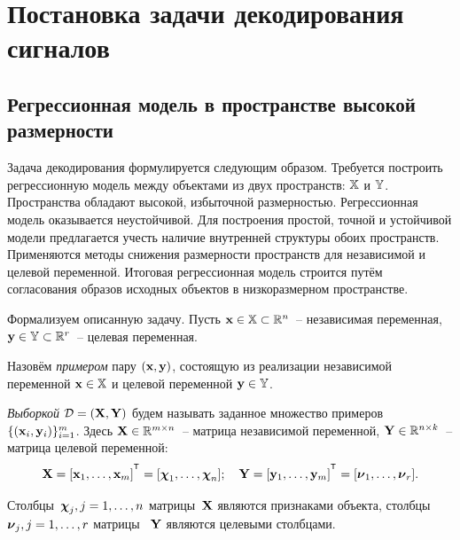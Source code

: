 \chapter{Постановка задачи декодирования сигналов}


\section{Регрессионная модель в пространстве высокой размерности}

Задача декодирования формулируется следующим образом. 
Требуется построить регрессионную модель между объектами из двух пространств: $\mathbb{X}$ и $\mathbb{Y}$.
Пространства обладают высокой, избыточной размерностью. 
Регрессионная модель оказывается неустойчивой.
Для построения простой, точной и устойчивой модели предлагается учесть наличие внутренней структуры обоих пространств. 
Применяются методы снижения размерности пространств для независимой и целевой переменной. 
Итоговая регрессионная модель строится путём согласования образов исходных объектов в низкоразмерном пространстве. 

Формализуем описанную задачу. 
Пусть $\mathbf{x} \in \mathbb{X} \subset \mathbb{R}^n$~-- независимая переменная, $\mathbf{y} \in \mathbb{Y} \subset \mathbb{R}^r$~-- целевая переменная.

\begin{definition}
	Назовём \textit{примером} пару $(\mathbf{x}, \mathbf{y})$, состоящую из реализации независимой переменной $\mathbf{x} \in \mathbb{X}$ и целевой переменной $\mathbf{y} \in \mathbb{Y}$. 
\end{definition}

\begin{definition}
	\textit{Выборкой} $\mathcal{D}=(\mathbf{X}, \mathbf{Y})$ будем называть заданное множество примеров $\{(\mathbf{x}_i, \mathbf{y}_i)\}_{i=1}^m$. Здесь $\mathbf{X} \in \mathbb{R}^{m \times n}$~-- матрица независимой переменной, $\mathbf{Y} \in \mathbb{R}^{n \times k}$~-- матрица целевой переменной:
	\begin{equation*}
	\bX = [\bx_1, \dots, \bx_m]^{\T} =  [\bchi_1, \dots, \bchi_n]; \quad \bY = [\by_1, \dots, \by_m]^{\T} =  [\bnu_1, \dots, \bnu_r].
	\end{equation*}
	
	Столбцы~$\boldsymbol{\chi}_j, j=1, \dots, n$ матрицы~$\mathbf{X}$ являются признаками объекта, столбцы~$\boldsymbol{\nu}_j, j=1, \dots, r$ матрицы ~$\mathbf{Y}$ являются целевыми столбцами.
	
\end{definition}

